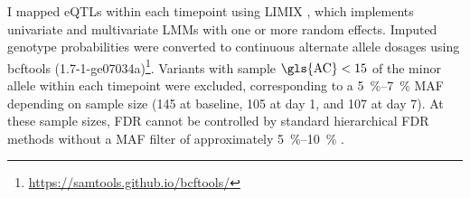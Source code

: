 %
I mapped \glspl{eQTL} within each timepoint using {LIMIX} \autocite{lippert2014LIMIXGeneticAnalysis}, which implements univariate and multivariate \glspl{LMM} with one or more random effects.
Imputed genotype probabilities were converted to continuous alternate allele dosages using bcftools (1.7-1-ge07034a)\footnote{\url{https://samtools.github.io/bcftools/}}.
Variants with sample $\text{\gls{AC}} < 15$ of the minor allele within each timepoint were excluded, 
corresponding to a \SIrange{5}{7}{\percent} \gls{MAF} depending on sample size (145 at baseline, 105 at day 1, and 107 at day 7).
At these sample sizes, \gls{FDR} cannot be controlled by standard hierarchical \gls{FDR} methods without a \gls{MAF} filter of approximately \SIrange{5}{10}{\percent} \autocite{huang2018PowerFalseDiscovery}.

